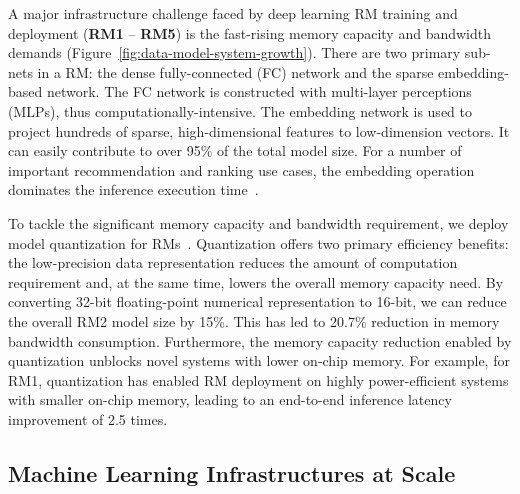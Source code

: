 A major infrastructure challenge faced by deep learning RM training and deployment (\textbf{RM1} -- \textbf{RM5}) is the fast-rising memory capacity and bandwidth demands (Figure~\ref{fig:data-model-system-growth}). There are two primary sub-nets in a RM: the dense fully-connected (FC) network and the sparse embedding-based network. The FC network is constructed with multi-layer perceptions (MLPs), thus computationally-intensive. The embedding network is used to project hundreds of sparse, high-dimensional features to low-dimension vectors. It can easily contribute to over 95\% of the total model size. For a number of important recommendation and ranking use cases, the embedding operation dominates the inference execution time~\cite{Gupta:hpca:2020,Ke:isca:2020}.

To tackle the significant memory capacity and bandwidth requirement, we deploy model quantization for RMs~\cite{deng:ieee-micro-2021}. 
Quantization offers two primary efficiency benefits: the low-precision data representation reduces the amount of computation requirement and, at the same time, lowers the overall memory capacity need. 
By converting 32-bit floating-point numerical representation to 16-bit, we can reduce the overall RM2 model size by 15\%. This has led to 20.7\% reduction in memory bandwidth consumption.
Furthermore, the memory capacity reduction enabled by quantization unblocks novel systems with lower on-chip memory. For example, for RM1, quantization has enabled RM deployment on highly power-efficient systems with smaller on-chip memory, leading to an end-to-end inference latency improvement of 2.5 times. 


\subsection{Machine Learning Infrastructures at Scale}

